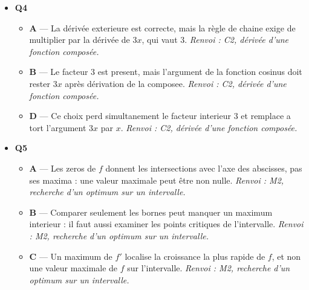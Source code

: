 \begin{itemize}
\begin{itemize}
  \end{itemize}
  \item \textbf{Q4}
  \begin{itemize}
    \item \textbf{A} — La dérivée exterieure est correcte, mais la règle de chaine exige de multiplier par la dérivée de $3x$, qui vaut $3$. \emph{Renvoi : C2, dérivée d'une fonction composée.}
    \item \textbf{B} — Le facteur $3$ est present, mais l'argument de la fonction cosinus doit rester $3x$ après dérivation de la composee. \emph{Renvoi : C2, dérivée d'une fonction composée.}
    \item \textbf{D} — Ce choix perd simultanement le facteur interieur $3$ et remplace a tort l'argument $3x$ par $x$. \emph{Renvoi : C2, dérivée d'une fonction composée.}
  \end{itemize}
  \item \textbf{Q5}
  \begin{itemize}
    \item \textbf{A} — Les zeros de $f$ donnent les intersections avec l'axe des abscisses, pas ses maxima : une valeur maximale peut être non nulle. \emph{Renvoi : M2, recherche d'un optimum sur un intervalle.}
    \item \textbf{B} — Comparer seulement les bornes peut manquer un maximum interieur : il faut aussi examiner les points critiques de l'intervalle. \emph{Renvoi : M2, recherche d'un optimum sur un intervalle.}
    \item \textbf{C} — Un maximum de $f'$ localise la croissance la plus rapide de $f$, et non une valeur maximale de $f$ sur l'intervalle. \emph{Renvoi : M2, recherche d'un optimum sur un intervalle.}
  \end{itemize}
\end{itemize}
\fi
